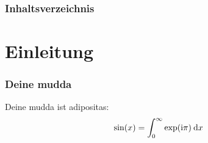


\iffalse
\subject{V27}
\title{Zeeman Effekt}
\date{
  Durchführung: 09. Juli 2018
  \hspace{3em}
  Abgabe: 08.08.2018
}



\maketitle
\tableofcontents
\newpage







\printbibliography


\fi





\begin{frame}
  \titlepage
\end{frame}

\begin{frame}
  \frametitle{Inhaltsverzeichnis}
  \tableofcontents
\end{frame}

\section{Einleitung}
  \begin{frame}
    \frametitle{Deine mudda}
    Deine mudda ist adipositas:
    \begin{equation}
      \sin(x)=\int_0^{\infty} \exp(\text i \pi) \: \text dx
    \end{equation}
  \end{frame}




